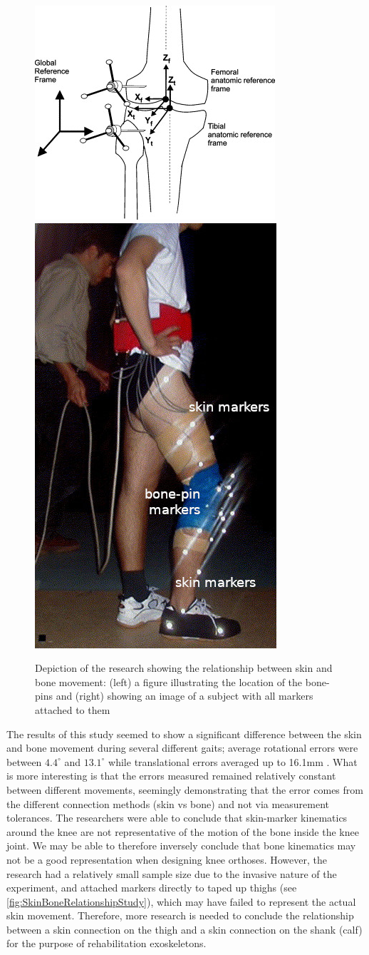 \begin{figure}[ht!]
    \centering
    \includegraphics[width=0.6\linewidth]{Figures/Background/SkinMovementResearch_Diagram.jpg}
    \includegraphics[width=0.3\linewidth]{Figures/Background/SkinMovementResearch_ImageMarked.jpg}
    \caption{Depiction of the research showing the relationship between skin and bone movement: (left) a figure illustrating the location of the bone-pins and (right) showing an image of a subject with all markers attached to them \cite{SkinMovementKneeKin}}
    \label{fig:SkinBoneRelationshipStudy}
\end{figure}

The results of this study seemed to show a significant difference between the skin and bone movement during several different gaits; average rotational errors were between \(4.4^\circ\) and \(13.1^\circ\) while translational errors averaged up to 16.1mm \cite{SkinMovementKneeKin}. What is more interesting is that the errors measured remained relatively constant between different movements, seemingly demonstrating that the error comes from the different connection methods (skin vs bone) and not via measurement tolerances. The researchers were able to conclude that skin-marker kinematics around the knee are not representative of the motion of the bone inside the knee joint. We may be able to therefore inversely conclude that bone kinematics may not be a good representation when designing knee orthoses. However, the research had a relatively small sample size due to the invasive nature of the experiment, and attached markers directly to taped up thighs (see \autoref{fig:SkinBoneRelationshipStudy}), which may have failed to represent the actual skin movement. Therefore, more research is needed to conclude the relationship between a skin connection on the thigh and a skin connection on the shank (calf) for the purpose of rehabilitation exoskeletons.

